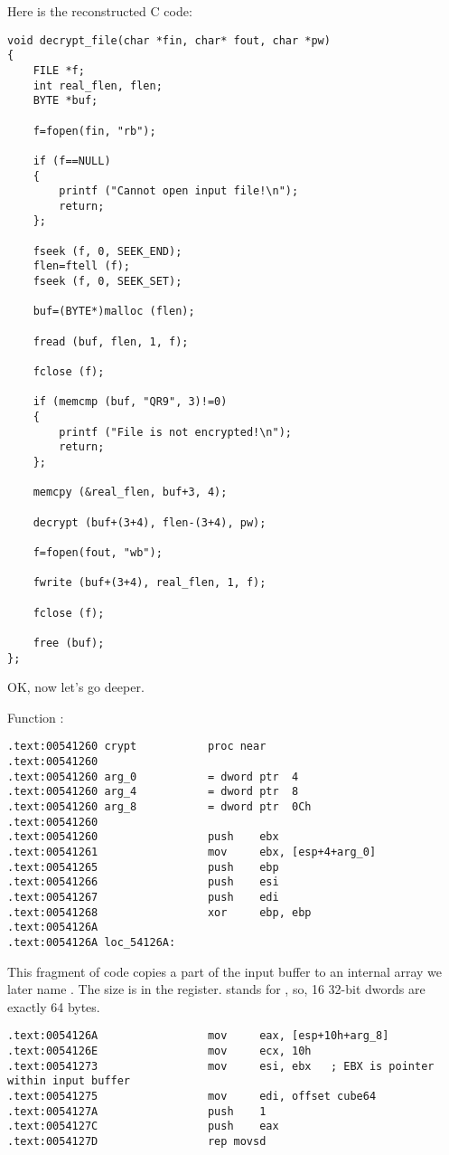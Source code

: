Here is the reconstructed C code:

\begin{lstlisting}[style=customc]
void decrypt_file(char *fin, char* fout, char *pw)
{
	FILE *f;
	int real_flen, flen;
	BYTE *buf;

	f=fopen(fin, "rb");
	
	if (f==NULL)
	{
		printf ("Cannot open input file!\n");
		return;
	};

	fseek (f, 0, SEEK_END);
	flen=ftell (f);
	fseek (f, 0, SEEK_SET);

	buf=(BYTE*)malloc (flen);

	fread (buf, flen, 1, f);

	fclose (f);

	if (memcmp (buf, "QR9", 3)!=0)
	{
		printf ("File is not encrypted!\n");
		return;
	};

	memcpy (&real_flen, buf+3, 4);

	decrypt (buf+(3+4), flen-(3+4), pw);
	
	f=fopen(fout, "wb");

	fwrite (buf+(3+4), real_flen, 1, f);

	fclose (f);

	free (buf);
};
\end{lstlisting}

OK, now let's go deeper.

Function :

\begin{lstlisting}[style=customasmx86]
.text:00541260 crypt           proc near
.text:00541260
.text:00541260 arg_0           = dword ptr  4
.text:00541260 arg_4           = dword ptr  8
.text:00541260 arg_8           = dword ptr  0Ch
.text:00541260
.text:00541260                 push    ebx
.text:00541261                 mov     ebx, [esp+4+arg_0]
.text:00541265                 push    ebp
.text:00541266                 push    esi
.text:00541267                 push    edi
.text:00541268                 xor     ebp, ebp
.text:0054126A
.text:0054126A loc_54126A:
\end{lstlisting}

This fragment of code copies a part of the input buffer to an internal array we later name .
The size is in the \ECX register.  stands for , so, 
16 32-bit dwords are exactly 64 bytes.

\begin{lstlisting}[style=customasmx86]
.text:0054126A                 mov     eax, [esp+10h+arg_8]
.text:0054126E                 mov     ecx, 10h
.text:00541273                 mov     esi, ebx   ; EBX is pointer within input buffer
.text:00541275                 mov     edi, offset cube64
.text:0054127A                 push    1
.text:0054127C                 push    eax
.text:0054127D                 rep movsd
\end{lstlisting}

